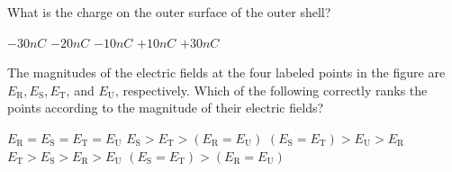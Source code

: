 \begin{questions}
\setcounter{question}{11}

\question
What is the charge on the outer surface of the outer shell?

\begin{oneparchoices}
    \choice $-30 \unit{nC}$
    \choice $-20 \unit{nC}$
    \choice $-10 \unit{nC}$
    \choice $+10 \unit{nC}$
    \choice $+30 \unit{nC}$
\end{oneparchoices}

\question
The magnitudes of the electric fields at the four labeled points in the figure are $E_{\mathrm{R}}, E_{\mathrm{S}}, E_{\mathrm{T}}$, and $E_{\mathrm{U}}$, respectively. Which of the following correctly ranks the points according to the magnitude of their electric fields?

\begin{choices}
    \choice $E_{\mathrm{R}}=E_{\mathrm{S}}=E_{\mathrm{T}}=E_{\mathrm{U}}$
    \choice $E_{\mathrm{S}}>E_{\mathrm{T}}>\left(E_{\mathrm{R}}=E_{\mathrm{U}}\right)$
    \choice $\left(E_{\mathrm{S}}=E_{\mathrm{T}}\right)>E_{\mathrm{U}}>E_{\mathrm{R}}$
    \choice $E_{\mathrm{T}}>E_{\mathrm{S}}>E_{\mathrm{R}}>E_{\mathrm{U}}$
    \choice $\left(E_{\mathrm{S}}=E_{\mathrm{T}}\right)>\left(E_{\mathrm{R}}=E_{\mathrm{U}}\right)$
\end{choices}

\end{questions}
